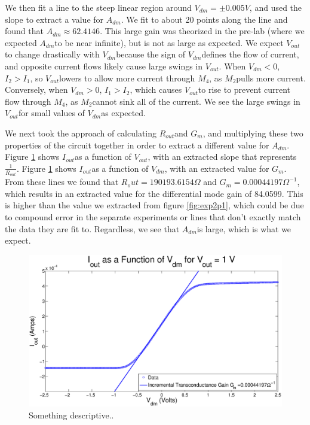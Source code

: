 \documentclass{article}
\newcommand{\Vout}{{$V_{out}$}}
\newcommand{\Vdm}{{$V_{dm}$}}
\newcommand{\Iout}{{$I_{out}$}}
\newcommand{\Gm}{{$G_{m}$}}
\newcommand{\Mtwo}{{$M_{2}$}}
\newcommand{\Mfour}{{$M_{4}$}}
\newcommand{\Adm}{{$A_{dm}$}}
\newcommand{\Rout}{{$R_{out}$}}
\begin{document}
We then fit a line to the steep linear region around $V_{dm} = \pm 0.005 V$, and used the slope to extract a value for \Adm. We fit to about 20 points along the line and found that $A_{dm} \approx 62.4146$. This large gain was theorized in the pre-lab (where we expected \Adm to be near infinite), but is not as large as expected. We expect \Vout to change drastically with \Vdm because the sign of \Vdm defines the flow of current, and opposite current flows likely cause large swings in \Vout. When $V_{dm} < 0$, $I_2 > I_1$, so \Vout lowers to allow more current through \Mfour, as \Mtwo pulls more current. Conversely, when $V_{dm} > 0$, $I_1 > I_2$, which causes \Vout to rise to prevent current flow through \Mfour, as \Mtwo cannot sink all of the current. We see the large swings in \Vout for small values of \Vdm as expected.

We next took the approach of calculating \Rout and \Gm, and multiplying these two properties of the circuit together in order to extract a different value for \Adm. Figure \ref{fig:exp2p3} shows \Iout as a function of \Vout, with an extracted slope that represents $\frac{1}{R_{out}}$. Figure \ref{fig:exp2p3} shows \Iout as a function of \Vdm, with an extracted value for \Gm. From these lines we found that $R_out = 190193.6154 \Omega$ and $G_m = 0.00044197 \Omega^{-1}$, which results in an extracted value for the differential mode gain of 84.0599. This is higher than the value we extracted from figure \ref{fig:exp2p1}, which could be due to compound error in the separate experiments or lines that don't exactly match the data they are fit to. Regardless, we see that \Adm is large, which is what we expect.

\begin{figure}[H]
\centering
\includegraphics[width=\linewidth]{../Figures/Exp2P3.eps}
\caption{Something descriptive..}
\label{fig:exp2p3}
\end{figure}
\end{document}
